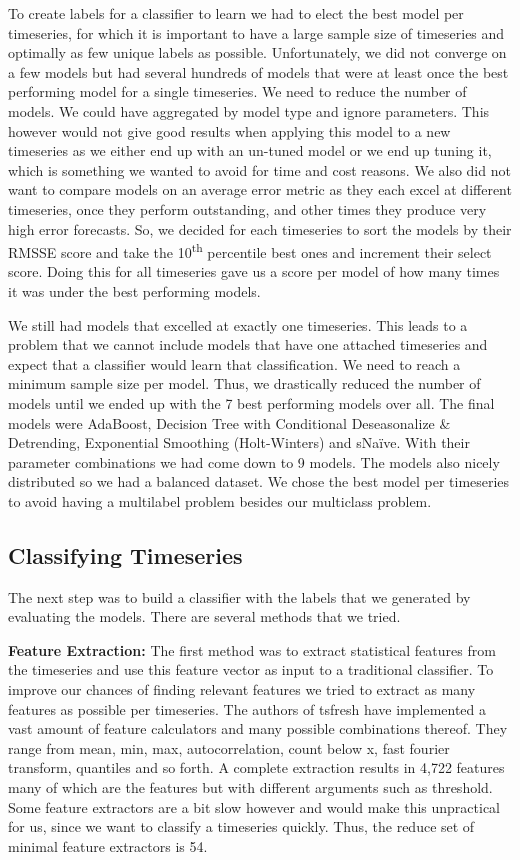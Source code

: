 To create labels for a classifier to learn we had to elect the best model per timeseries, for which it is important to have a large sample size of timeseries and optimally as few unique labels as possible. Unfortunately, we did not converge on a few models but had several hundreds of models that were at least once the best performing model for a single timeseries. We need to reduce the number of models. We could have aggregated by model type and ignore parameters. This however would not give good results when applying this model to a new timeseries as we either end up with an un-tuned model or we end up tuning it, which is something we wanted to avoid for time and cost reasons. We also did not want to compare models on an average error metric as they each excel at different timeseries, once they perform outstanding, and other times they produce very high error forecasts. So, we decided for each timeseries to sort the models by their RMSSE score and take the 10\textsuperscript{th} percentile best ones and increment their select score. Doing this for all timeseries gave us a score per model of how many times it was under the best performing models.

We still had models that excelled at exactly one timeseries. This leads to a problem that we cannot include models that have one attached timeseries and expect that a classifier would learn that classification. We need to reach a minimum sample size per model. Thus, we drastically reduced the number of models until we ended up with the 7 best performing models over all. The final models were AdaBoost, Decision Tree with Conditional Deseasonalize \& Detrending, Exponential Smoothing (Holt-Winters) and sNa\"ive. With their parameter combinations we had come down to 9 models. The models also nicely distributed so we had a balanced dataset. We chose the best model per timeseries to avoid having a multilabel problem besides our multiclass problem.


\subsection{Classifying Timeseries}

The next step was to build a classifier with the labels that we generated by evaluating the models. There are several methods that we tried.

\textbf{Feature Extraction:} The first method was to extract statistical features from the timeseries and use this feature vector as input to a traditional classifier. To improve our chances of finding relevant features we tried to extract as many features as possible per timeseries. The authors of tsfresh \cite{tsfresh} have implemented a vast amount of feature calculators and many possible combinations thereof. They range from mean, min, max, autocorrelation, count below x, fast fourier transform, quantiles and so forth. A complete extraction results in 4,722 features many of which are the features but with different arguments such as threshold. Some feature extractors are a bit slow however and would make this unpractical for us, since we want to classify a timeseries quickly. Thus, the reduce set of minimal feature extractors is 54. 

